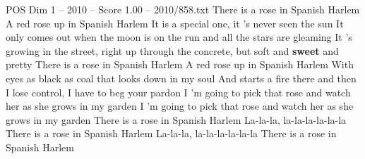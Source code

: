 \begin{textsample}{POS Dim 1 – 2010 – Score 1.00 – 2010/858.txt}  \label{ex:f1_pos_024}
There is a rose in Spanish Harlem A red rose up in Spanish Harlem It is a special one, it 's never seen the sun It only comes out when the moon is on the run and all the stars are gleaming It 's growing in the street, right up through the concrete, but soft and \textbf{sweet} and pretty There is a rose in Spanish Harlem A red rose up in Spanish Harlem With eyes as black as coal that looks down in my soul And starts a fire there and then I lose control, I have to beg your pardon I 'm going to pick that rose and watch her as she grows in my garden I 'm going to pick that rose and watch her as she grows in my garden There is a rose in Spanish Harlem La-la-la, la-la-la-la-la-la There is a rose in Spanish Harlem La-la-la, la-la-la-la-la-la There is a rose in Spanish Harlem

\end{textsample}
